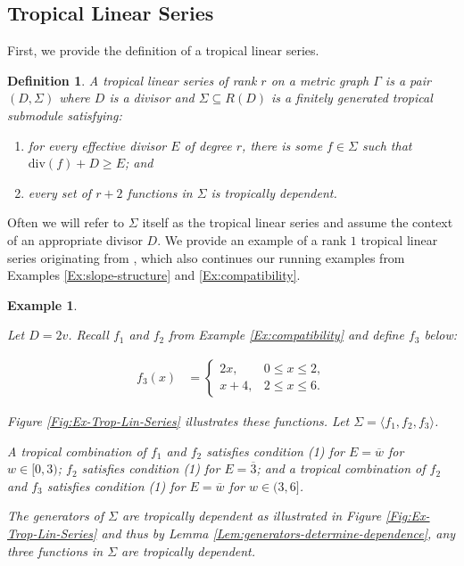 \documentclass{amsart}
\newtheorem{definition}[theorem]{Definition}
\newtheorem{varexample}[theorem]{Example}
\newenvironment{example}{\begin{varexample}
		\begin{normalfont}}{\end{normalfont}
\end{varexample}}
\begin{document}
	\subsection{Tropical Linear Series}
	\label{Subsec:TLS}
	
	First, we provide the definition of a tropical linear series.
	
	\begin{definition}
		\label{Def:Tropical-Linear-Series}
		A tropical linear series of rank $r$ on a metric graph $\Gamma$ is a pair $(D,\Sigma)$ where $D$ is a divisor and $\Sigma \subseteq R(D)$ is a finitely generated tropical submodule satisfying:
		\begin{enumerate}
			\item for every effective divisor $E$ of degree $r$, there is some $f \in \Sigma$ such that $\mathrm{div}(f) + D \geq E$; and
			\item every set of $r+2$ functions in $\Sigma$ is tropically dependent.
		\end{enumerate}
	\end{definition}
	
	Often we will refer to $\Sigma$ itself as the tropical linear series and assume the context of an appropriate divisor $D$. We provide an example of a rank $1$ tropical linear series originating from \cite[Example~6.10]{farkas2025kodairadimensionsoverlinemathcalm22overlinemathcalm23}, which also continues our running examples from Examples \ref{Ex:slope-structure} and \ref{Ex:compatibility}.
	
	\begin{example}
		\label{Ex:trop-lin-series}
		Let $D = 2v$. Recall $f_1$ and $f_2$ from Example \ref{Ex:compatibility} and define $f_3$ below: 
		
		\[
		\begin{aligned}
			f_3(x) &=
			\begin{cases}
				2x, & 0\le x\le 2,\\
				x+4, & 2\le x\le 6.
			\end{cases}
		\end{aligned}
		\]
		
		Figure \ref{Fig:Ex-Trop-Lin-Series} illustrates these functions. Let $\Sigma = \langle f_1, f_2, f_3 \rangle$.
		
		A tropical combination of $f_1$ and $f_2$ satisfies condition (1) for $E = \overline{w}$ for $w \in [0, 3)$; $f_2$ satisfies condition (1) for $E = \overline{3}$; and a tropical combination of $f_2$ and $f_3$ satisfies condition (1) for $E = \overline{w}$ for $w \in (3, 6]$.
		
		The generators of $\Sigma$ are tropically dependent as illustrated in Figure \ref{Fig:Ex-Trop-Lin-Series} and thus by Lemma \ref{Lem:generators-determine-dependence}, any three functions in $\Sigma$ are tropically dependent.
	\end{example}
	
\end{document}
